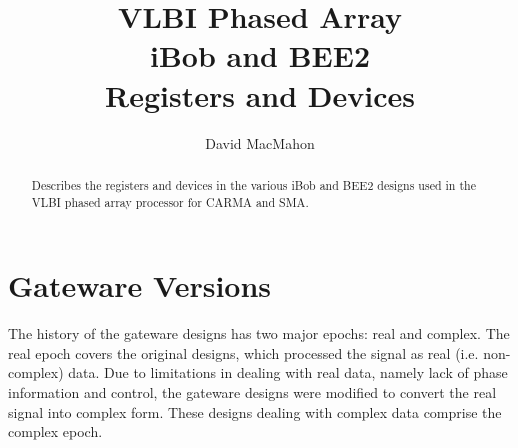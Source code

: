 \documentclass[12pt]{article}
\author{David MacMahon}
\title{VLBI Phased Array \\ iBob and BEE2 \\ Registers and Devices}
\begin{document}
\maketitle
\setlength{\parindent}{0pt}
\setlength{\parskip}{1ex plus 0.5ex minus 0.2ex}
\setlength{\itemseporig}{\itemsep}

\newcommand{\tighten}{
  \setlength{\itemsep}{-\parskip}
}
\newcommand{\loosen}{
  \setlength{\itemsep}{\itemseporig}
}
\newcommand{\LSB}{least significant byte }
\newcommand{\LSn}{least significant nybble }
\newcommand{\LSb}{least significant bit }
\newcommand{\LSns}{least significant nybbles }
\newcommand{\LSbs}{least significant bits }
\newcommand{\MSb}{most significant bit }
\newcommand{\devitem}[2]{\item[#1] [#2] \\ }
\newcommand{\rwreg}[1]{\devitem{#1}{R/W register}}
\newcommand{\rwregn}[1]{\item[#1] {} \tighten} %
\newcommand{\rwregs}[1]{\devitem{#1}{R/W registers} \loosen} %
\newcommand{\roreg}[1]{\devitem{#1}{R register}}
\newcommand{\roregn}[1]{\item[#1] {} \tighten} %
\newcommand{\roregs}[1]{\devitem{#1}{R registers} \loosen} %
\newcommand{\bram}[1]{\devitem{#1}{Block RAM}}
\newcommand{\bramn}[1]{\item[#1] {} \tighten} %
\newcommand{\brams}[1]{\devitem{#1}{Block RAM} \loosen} %
\newcommand{\degree}[1]{$#1^{\circ}$}

\begin{abstract}
Describes the registers and devices in the various iBob and BEE2 designs used
in the VLBI phased array processor for CARMA and SMA.
\end{abstract}

\section{Gateware Versions}

The history of the gateware designs has two major epochs: real and complex.
The real epoch covers the original designs, which processed the signal as real
(i.e. non-complex) data.  Due to limitations in dealing with real data, namely
lack of phase information and control, the gateware designs were modified to
convert the real signal into complex form.  These designs dealing with complex
data comprise the complex epoch.
\end{document}
